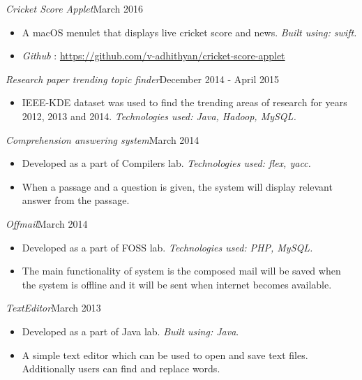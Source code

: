\documentclass[11pt,a4paper]{article}
\begin{document}
\emph{Cricket Score Applet}{\hfill March 2016}
\begin{itemize}[noitemsep]
\item A macOS menulet that displays live cricket score and news. \emph{Built using: swift.}
\item \emph{Github} : \href{https://github.com/v-adhithyan/cricket-score-applet}{https://github.com/v-adhithyan/cricket-score-applet}
\end{itemize}
\emph{Research paper trending topic finder}{\hfill December 2014 - April 2015}
\begin{itemize}[noitemsep]
\item  IEEE-KDE dataset was used to find the trending areas of research for years 2012, 2013 and 2014. \emph{Technologies
used: Java, Hadoop, MySQL.}
\end{itemize}
\emph{Comprehension answering system}{\hfill March 2014}
\begin{itemize}[noitemsep]
\item Developed as a part of Compilers lab. \emph{Technologies used: flex, yacc.}
\item When a passage and a question is given, the system will display relevant answer from the passage.
\end{itemize}
\emph{Offmail}{\hfill March 2014}
\begin{itemize}[noitemsep]
\item Developed as a part of FOSS lab. \emph{Technologies used: PHP, MySQL.}
\item The main functionality of system is the composed mail will be saved when the system is offline and it will be sent when internet
becomes available.
\end{itemize}
\emph{TextEditor}{\hfill March 2013}
\begin{itemize}[noitemsep]
\item Developed as a part of Java lab. \emph{Built using: Java}.
\item A simple text editor which can be used to open and save text files. Additionally users can find and replace
words.
\end{itemize}
\end{document}
